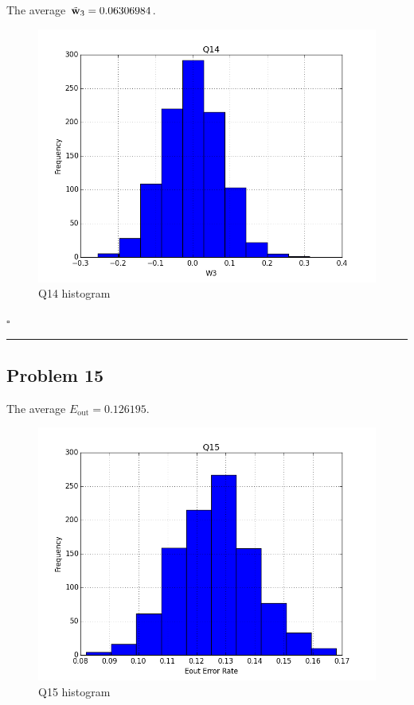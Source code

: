 \documentclass[12pt]{article}
\newcommand*{\QEDB}{\hfill\ensuremath{\square}}
\newcommand{\BF}[1]{{\bf#1}}
\newcommand{\horrule}[1]{\rule{\linewidth}{#1}}
\begin{document}
The average $\tilde{\BF{w}}_{3}={0.06306984}$.
\begin{figure}[h]
	\centering
	\includegraphics[scale=0.3]{Q14.png}
	\caption{Q14 histogram}
	\label{Q14}
\end{figure}

\QEDB

\horrule{0.5pt}

\newpage
\subsection*{Problem 15}

The average $E_{\text{out}}=0.126195$.
\begin{figure}[h]
	\centering
	\includegraphics[scale=0.3]{Q15.png}
	\caption{Q15 histogram}
	\label{Q15}
\end{figure}
\end{document}
